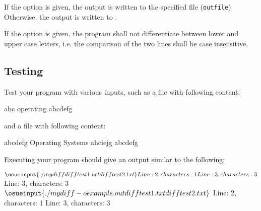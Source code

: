If the option  is given,
the output is written to the specified file (\verb|outfile|).
Otherwise, the output is written to .

If the option  is given,
the program shall not differentiate between lower and upper case letters,
i.e. the comparison of the two lines shall be case insensitive.

\subsection*{Testing}

Test your program with various inputs,
such as a file  with following content:

\begin{osuefmtcode}
      abc
      operating
      abcdefg
\end{osuefmtcode}

and a file  with following content:

\begin{osuefmtcode}
      abcdefg
      Operating Systems
      ahciejg
      abcdefg
\end{osuefmtcode}

Executing your program should give an output similar to the following:

\begin{osuefmtcode}
    $ \osueinput{./mydiff difftest1.txt difftest2.txt}
    Line: 2, characters: 1
    Line: 3, characters: 3
    $ 
    Line: 3, characters: 3
    $ \osueinput{./mydiff -o example.out difftest1.txt difftest2.txt}
    $ 
    Line: 2, characters: 1
    Line: 3, characters: 3
\end{osuefmtcode}

\osueguidelinesone


